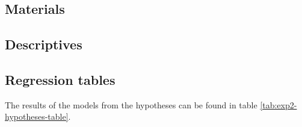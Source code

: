 \documentclass[
  doc,floatsintext]{apa6}
\begin{document}
\hypertarget{materials-2}{%
\subsection{Materials}\label{materials-2}}

\FloatBarrier

\hypertarget{descriptives-1}{%
\subsection{Descriptives}\label{descriptives-1}}

\begin{table}
\centering\centering
\caption{\label{tab:exp2-descriptives}Descriptives}
\centering
{}
\end{table}

\hypertarget{regression-tables-1}{%
\subsection{Regression tables}\label{regression-tables-1}}

The results of the models from the hypotheses can be found in table \ref{tab:exp2-hypotheses-table}.
\end{document}
